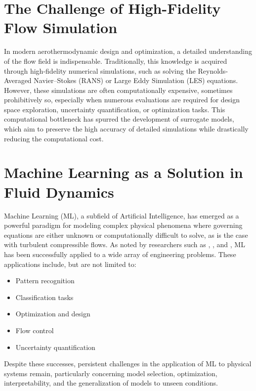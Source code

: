 \documentclass[dscexam, EN]{ufabcFHZh}
\begin{document}
\section{The Challenge of High-Fidelity Flow Simulation}

In modern aerothermodynamic design and optimization, a detailed understanding of the flow field is indispensable. Traditionally, this knowledge is acquired through high-fidelity numerical simulations, such as solving the Reynolds-Averaged Navier–Stokes (RANS) or Large Eddy Simulation (LES) equations. However, these simulations are often computationally expensive, sometimes prohibitively so, especially when numerous evaluations are required for design space exploration, uncertainty quantification, or optimization tasks. This computational bottleneck has spurred the development of surrogate models, which aim to preserve the high accuracy of detailed simulations while drastically reducing the computational cost.

\section{Machine Learning as a Solution in Fluid Dynamics}

Machine Learning (ML), a subfield of Artificial Intelligence, has emerged as a powerful paradigm for modeling complex physical phenomena where governing equations are either unknown or computationally difficult to solve, as is the case with turbulent compressible flows. As noted by researchers such as \citet{mendezChallenges2024}, \citet{Brunton2020}, and \citet{vinuesaEmerging2022}, ML has been successfully applied to a wide array of engineering problems. These applications include, but are not limited to:
\begin{itemize}
    \item Pattern recognition \citep{bishopPattern2006, Groun2022, Salehi2018}
    \item Classification tasks \citep{Wang2016}
    \item Optimization and design \citep{Bock2019, ferreiraEnsemble2018, Kianifar2020, Peters2023}
    \item Flow control \citep{Montans2019, talaeiBoundary2018}
    \item Uncertainty quantification \citep{chuDeep2024, pengApplying2024, liangLiquid2024}
\end{itemize}
Despite these successes, persistent challenges in the application of ML to physical systems remain, particularly concerning model selection, optimization, interpretability, and the generalization of models to unseen conditions.
\end{document}
